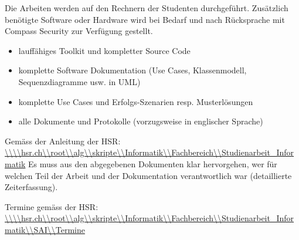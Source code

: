 Die Arbeiten werden auf den Rechnern der Studenten durchgeführt. Zusätzlich benötigte Software oder Hardware wird bei Bedarf und nach Rücksprache mit Compass Security zur Verfügung gestellt. 

\begin{itemize}
    \item lauffähiges Toolkit und kompletter Source Code
    \item komplette Software Dokumentation (Use Cases, Klassenmodell, Sequenzdiagramme usw. in UML)
    \item komplette Use Cases und Erfolgs-Szenarien resp. Musterlösungen
    \item alle Dokumente und Protokolle (vorzugsweise in englischer Sprache)
\end{itemize}

Gemäss der Anleitung der HSR: \url{\\\\hsr.ch\\root\\alg\\skripte\\Informatik\\Fachbereich\\Studienarbeit_Informatik}
Es muss aus den abgegebenen Dokumenten klar hervorgehen, wer für welchen Teil der Arbeit und der Dokumentation verantwortlich war (detaillierte Zeiterfassung).

Termine gemäss der HSR: \url{\\\\hsr.ch\\root\\alg\\skripte\\Informatik\\Fachbereich\\Studienarbeit_Informatik\\SAI\\Termine}


